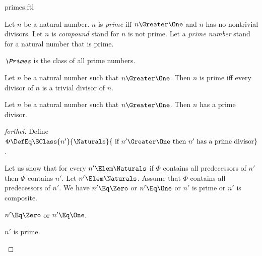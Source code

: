 \documentclass{stex}
\begin{document}
\begin{smodule}{primes.ftl}




\begin{definition*}[forthel,for={prime,compound,prime number}]
  Let $n$ be a natural number.
  $n$ is \emph{prime} iff $n \Greater \One$ and $n$ has no nontrivial divisors.
  Let $n$ is \emph{compound} stand for $n$ is not prime.
  Let a \emph{prime number} stand for a natural number that is prime.
\end{definition*}

\begin{definition*}[forthel,for=Primes]
  $\emph{\Primes}$ is the class of all prime numbers.
\end{definition*}

\begin{proposition*}[forthel]
  Let $n$ be a natural number such that $n \Greater \One$.
  Then $n$ is prime iff every divisor of $n$ is a trivial divisor of $n$.
\end{proposition*}

\begin{proposition*}[forthel]
  Let $n$ be a natural number such that $n \Greater \One$.
  Then $n$ has a prime divisor.
\end{proposition*}
\begin{proof}[forthel]
  Define $\Phi \DefEq \SClass{n'}{\Naturals}{\text{ if }n' \Greater \One\text{ then }n'\text{ has a prime divisor}}$.

  Let us show that for every $n' \Elem \Naturals$ if $\Phi$ contains all
  predecessors of $n'$ then $\Phi$ contains $n'$.
    Let $n' \Elem \Naturals$.
    Assume that $\Phi$ contains all predecessors of $n'$.
    We have $n' \Eq \Zero$ or $n' \Eq \One$ or $n'$ is prime or $n'$ is composite.

    \begin{case}{$n' \Eq \Zero$ or $n' \Eq \One$.} \end{case}

    \begin{case}{$n'$ is prime.} \end{case}


\end{proof}
\end{smodule}
\end{document}
